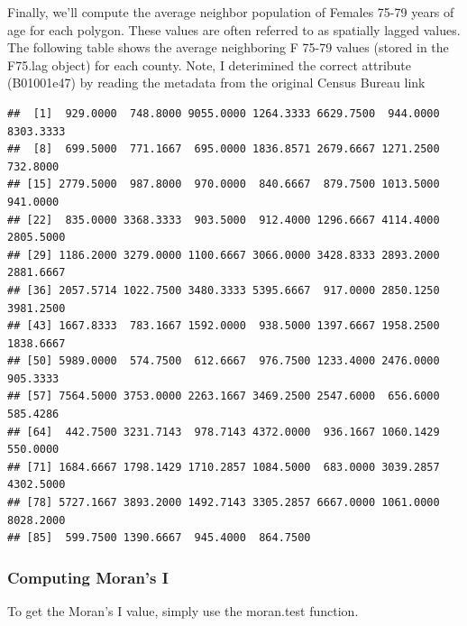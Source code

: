\documentclass[]{article}
\newenvironment{Shaded}{\begin{snugshade}}{\end{snugshade}}
\newcommand{\FunctionTok}[1]{\textcolor[rgb]{0.13,0.29,0.53}{\textbf{#1}}}
\newcommand{\NormalTok}[1]{#1}
\newcommand{\OtherTok}[1]{\textcolor[rgb]{0.56,0.35,0.01}{#1}}
\newcommand{\SpecialCharTok}[1]{\textcolor[rgb]{0.81,0.36,0.00}{\textbf{#1}}}
\begin{document}
Finally, we'll compute the average neighbor population of Females 75-79
years of age for each polygon. These values are often referred to as
spatially lagged values. The following table shows the average
neighboring F 75-79 values (stored in the F75.lag object) for each
county. Note, I deterimined the correct attribute (B01001e47) by reading
the metadata from the original Census Bureau link

\begin{Shaded}
\end{Shaded}

\begin{verbatim}
##  [1]  929.0000  748.8000 9055.0000 1264.3333 6629.7500  944.0000 8303.3333
##  [8]  699.5000  771.1667  695.0000 1836.8571 2679.6667 1271.2500  732.8000
## [15] 2779.5000  987.8000  970.0000  840.6667  879.7500 1013.5000  941.0000
## [22]  835.0000 3368.3333  903.5000  912.4000 1296.6667 4114.4000 2805.5000
## [29] 1186.2000 3279.0000 1100.6667 3066.0000 3428.8333 2893.2000 2881.6667
## [36] 2057.5714 1022.7500 3480.3333 5395.6667  917.0000 2850.1250 3981.2500
## [43] 1667.8333  783.1667 1592.0000  938.5000 1397.6667 1958.2500 1838.6667
## [50] 5989.0000  574.7500  612.6667  976.7500 1233.4000 2476.0000  905.3333
## [57] 7564.5000 3753.0000 2263.1667 3469.2500 2547.6000  656.6000  585.4286
## [64]  442.7500 3231.7143  978.7143 4372.0000  936.1667 1060.1429  550.0000
## [71] 1684.6667 1798.1429 1710.2857 1084.5000  683.0000 3039.2857 4302.5000
## [78] 5727.1667 3893.2000 1492.7143 3305.2857 6667.0000 1061.0000 8028.2000
## [85]  599.7500 1390.6667  945.4000  864.7500
\end{verbatim}

\subsubsection{Computing Moran's I}\label{computing-morans-i}

To get the Moran's I value, simply use the moran.test function.

\begin{Shaded}
\end{Shaded}
\end{document}
